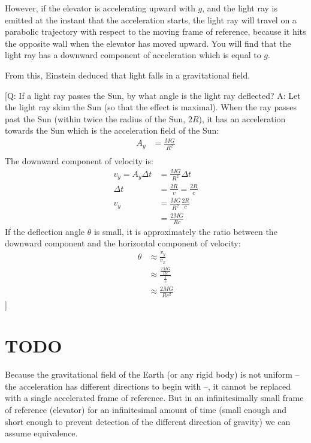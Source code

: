 \documentclass[pagesize,headsepline,10pt,parskip=half,BCOR=12mm]{scrreprt}
\begin{document}
      However, if the elevator is accelerating upward with $g$, and
      the light ray is emitted at the instant that the
      acceleration starts, the light ray will travel on a parabolic
      trajectory with respect to the moving frame of reference,
      because it hits the opposite wall when the elevator has moved
      upward.  You will find that the light ray has a downward
      component of acceleration which is equal to $g$.

      From this, Einstein deduced that light falls in a
      gravitational field.

      [Q: If a light ray passes the Sun, by what angle is the light
      ray deflected?
      A: Let the light ray skim the Sun (so that the effect is
      maximal).  When the ray passes past the Sun (within twice the
      radius of the Sun, $2R$), it has an acceleration towards the
      Sun which is the acceleration field of the Sun:
      \begin{align*}
        A_y &= \frac{MG}{R^2} \\
      \end{align*}
      The downward component of velocity is:
      \begin{align*}
        v_y = A_y \Delta t &= \frac{MG}{R^2} \Delta t\\
        \Delta t &= \frac{2R}{v} = \frac{2R}{c} \\
        v_y &= \frac{MG}{R^2} \frac{2R}{c}\\
            &= \frac{2MG}{Rc}
      \end{align*}
      If the deflection angle $\theta$ is small, it is
      approximately the ratio between the downward component and
      the horizontal component of velocity:
      \begin{align*}
        \theta &\approx \frac{v_y}{v_x} \\
        &\approx \frac{\frac{2MG}{Rc}}{\frac{1}{c}} \\
        &\approx \frac{2MG}{Rc^2}
      \end{align*}]

    \section{TODO}
      Because the gravitational field of the Earth (or any rigid
      body) is not uniform -- the acceleration has different
      directions to begin with --, it cannot be replaced with a
      single accelerated frame of reference.  But in an
      infinitesimally small frame of reference (elevator) for an
      infinitesimal amount of time (small enough and short enough
      to prevent detection of the different direction of gravity)
      we can assume equivalence.
\end{document}
